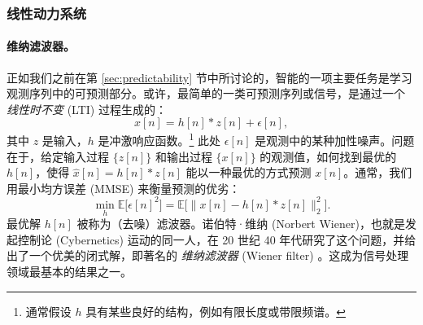 \documentclass[../../book-main_zh.tex]{subfiles}
\begin{document}

\subsubsection{线性动力系统}
\label{sec:linear-systems}

\paragraph{维纳滤波器。}

正如我们之前在第 \ref{sec:predictability} 节中所讨论的，智能的一项主要任务是学习观测序列中的可预测部分。或许，最简单的一类可预测序列或信号，是通过一个 {\em 线性时不变} (LTI) 过程生成的：
\begin{equation}
    x[n] = h[n]*z[n] + \epsilon[n], 
    \label{eqn:Wiener-model}
\end{equation}
其中 $z$ 是输入，$h$ 是冲激响应函数。\footnote{通常假设 $h$ 具有某些良好的结构，例如有限长度或带限频谱。} 此处 $\epsilon[n]$ 是观测中的某种加性噪声。问题在于，给定输入过程 $\{z[n]\}$ 和输出过程 $\{x[n]\}$ 的观测值，如何找到最优的 $h[n]$，使得 $\hat x[n] = h[n]*z[n]$ 能以一种最优的方式预测 $x[n]$。通常，我们用最小均方误差 (MMSE) 来衡量预测的优劣：
\begin{equation}
    \min_{h} \mathbb{E} \big[\epsilon[n]^2\big] = \mathbb{E} \big[\|x[n] - h[n]*z[n]\|_2^2\big].
\end{equation}
最优解 $h[n]$ 被称为（去噪）滤波器。诺伯特·维纳 (Norbert Wiener)，也就是发起控制论 (Cybernetics) 运动的同一人，在 20 世纪 40 年代研究了这个问题，并给出了一个优美的闭式解，即著名的 {\em 维纳滤波器} (Wiener filter) \cite{Wiener-1942,Wiener-1949}。这成为信号处理领域最基本的结果之一。
\end{document}
